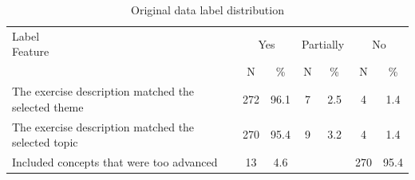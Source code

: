 \documentclass[english, 12pt, a4paper, sci, utf8, a-2b, online]{../definitions/aaltothesis}
\begin{document}
\begin{table}
    \centering
    \begin{tabularx}{\textwidth}{Xcccccc}
        \toprule
        \makecell[l]{Label \\ Feature} 
        & \multicolumn{2}{c}{Yes} 
        & \multicolumn{2}{c}{Partially} 
        & \multicolumn{2}{c}{No} \\
        & N & \% & N & \% & N & \% \\
        \midrule
        The exercise description matched the selected theme 
        & 272 & 96.1 & 7 & 2.5 & 4 & 1.4 \\
        
        The exercise description matched the selected topic 
        & 270 & 95.4 & 9 & 3.2 & 4 & 1.4 \\
        
        Included concepts that were too advanced 
        & 13 & 4.6 & {} & {} & 270 & 95.4 \\
        \bottomrule
    \end{tabularx}
    \caption{Original data label distribution}
    \label{tb:original_data}
\end{table}
\end{document}
